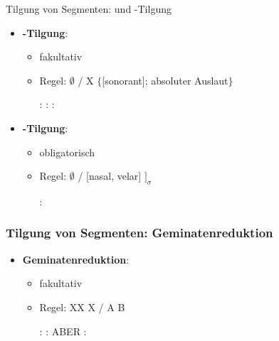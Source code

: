 \begin{frame}{Tilgung von Segmenten:  und -Tilgung}

\begin{itemize}
	\item \textbf{-Tilgung}:
	
	\begin{itemize}
		\item fakultativ
		\item Regel:  \ras $\emptyset$ / X \underline{\quad} $\{$[sonorant]; absoluter Auslaut$\}$
	
	\eal
		\ex {}:  \ras \textipa{[ge:n]}
		\ex {}:  \ras \textipa{[k\t{aU}f]}
		\ex {}:  \ras {}
	\zl
	
	\end{itemize}

	\item \textbf{-Tilgung}:
	
	\begin{itemize}
		\item obligatorisch
		\item Regel:  \ras $\emptyset$ / [nasal, velar] \underline{\quad} $]_\sigma$
		
		\ea {}:  \ras {}
		\z
		
	\end{itemize}
			
\end{itemize}

\end{frame}


\begin{frame}
\frametitle{Tilgung von Segmenten: Geminatenreduktion}

\begin{itemize}
	\item \textbf{Geminatenreduktion}:

	\begin{itemize}
		\item fakultativ
		\item Regel: XX \ras X / A \underline{\quad} B

	\eal
		\ex {}:  \ras {}
		\ex {}:  \ras \textipa{[SI\.{f}a:{\textscr}t]}
		\ex ABER :  \ras \textipa{[\t{ts}o:.Po.p5]}
	\zl
	
	\end{itemize}
	
\end{itemize}

\end{frame}




